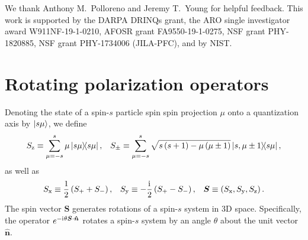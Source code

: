 \documentclass[nofootinbib,twocolumn]{revtex4-1}
\newcommand{\f}[2]{\dfrac{#1}{#2}} %
\newcommand{\p}[1]{\left(#1\right)} %
\newcommand{\uv}[1]{\bm{\hat{#1}}} %
\renewcommand{\i}{\mathrm{i}\mkern1mu} %
\newcommand{\x}{\text{x}}
\newcommand{\y}{\text{y}}
\newcommand{\z}{\text{z}}
\begin{document}
\begin{acknowledgments}
We thank Anthony M.~Polloreno and Jeremy T.~Young for helpful feedback.
This work is supported  by the DARPA DRINQs grant, the ARO single investigator award W911NF-19-1-0210, AFOSR grant FA9550-19-1-0275, NSF grant PHY-1820885, NSF grant PHY-1734006 (JILA-PFC), and by NIST.
\end{acknowledgments}


\onecolumngrid
\newpage
\appendix

\section{Rotating polarization operators}
\label{sec:rotations}

Denoting the state of a spin-$s$ particle spin spin projection $\mu$ onto a quantization axis by $\ket{s\mu}$, we define
\begin{align}
  S_\z \equiv \sum_{\mu=-s}^s \mu \op{s\mu},
  &&
  S_\pm \equiv \sum_{\mu=-s}^s
  \sqrt{s\p{s+1}-\mu\p{\mu\pm1}} \op{s,\mu\pm1}{s\mu},
  \label{eq:spin_ops}
\end{align}
as well as
\begin{align}
  S_\x \equiv \f12\p{S_+ + S_-},
  &&
  S_\y \equiv -\f\i2\p{S_+-S_-},
  &&
  \bm S \equiv \p{S_\x,S_\y,S_\z}.
\end{align}
The spin vector $\bm S$ generates rotations of a spin-$s$ system in 3D space.
Specifically, the operator $e^{-\i\theta\bm S\cdot\uv n}$ rotates a spin-$s$ system by an angle $\theta$ about the unit vector $\uv n$.
\end{document}
